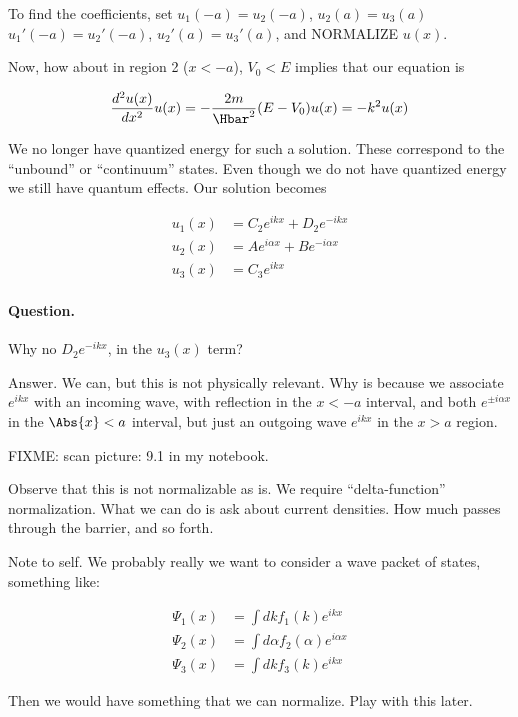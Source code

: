 To find the coefficients, set $u_1(-a) = u_2(-a)$, $u_2(a) = u_3(a)$ $u_1'(-a) = u_2'(-a)$, $u_2'(a) = u_3'(a)$, and NORMALIZE $u(x)$.

Now, how about in region 2 ($x < -a$), $V_0 < E$ implies that our equation is

\begin{align}\label{eqn:PHY356Lecture9:40}
\frac{d^2 u(x)}{dx^2} u(x) = - \frac{2m}{\Hbar^2} (E - V_0) u(x) = - k^2 u(x)
\end{align}

We no longer have quantized energy for such a solution.  These correspond to the ``unbound'' or ``continuum'' states.  Even though we do not have quantized energy we still have quantum effects.  Our solution becomes

\begin{align*}
u_1(x) &=
C_2 e^{i k x}
+D_2 e^{-i k x}  \\
u_2(x) &=
A e^{i \alpha x}
+B e^{-i \alpha x}  \\
u_3(x) &=
C_3 e^{i k x}
\end{align*}

\paragraph{Question.}  Why no $D_2 e^{-i k x}$, in the $u_3(x)$ term?

Answer.  We can, but this is not physically relevant.  Why is because we associate $e^{ikx}$ with an incoming wave, with reflection in the $x < -a$ interval, and both $e^{\pm i \alpha x}$ in the $\Abs{x} < a$ interval, but just an outgoing wave $e^{i k x}$ in the $x > a$ region.

FIXME: scan picture: 9.1 in my notebook.

Observe that this is not normalizable as is.  We require ``delta-function'' normalization.  What we can do is ask about current densities.  How much passes through the barrier, and so forth.

Note to self.  We probably really we want to consider a wave packet of states, something like:

\begin{align*}
\Psi_1(x) &= \int dk f_1(k) e^{i k x} \\
\Psi_2(x) &= \int d\alpha f_2(\alpha) e^{i \alpha x} \\
\Psi_3(x) &= \int dk f_3(k) e^{i k x}
\end{align*}

Then we would have something that we can normalize.  Play with this later.

